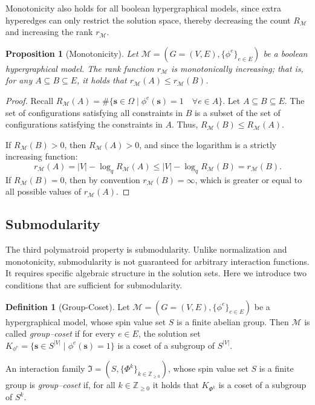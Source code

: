 \documentclass[11pt,reqno]{amsart}
\newcommand{\vecs}{\boldsymbol{s}}
\newcommand{\Mo}{\mathcal{M}}
\newcommand{\statespace}{\Omega}
\newcommand{\IFam}{\mathfrak{I}}
\newcommand{\sset}{spin value set }
\theoremstyle{plain}
\newtheorem{proposition}[theorem]{Proposition}
\theoremstyle{definition}
\newtheorem{definition}[theorem]{Definition}
\numberwithin{equation}{section}
\begin{document}
Monotonicity also holds for all boolean hypergraphical models, since extra hyper\-edges can only restrict the solution space, thereby decreasing the count $R_{\Mo}$ and increasing the rank $r_{\Mo}$.

\begin{proposition}[Monotonicity]
    Let $\Mo = (G=(V,E), \{\phi^e\}_{e \in E})$ be a boolean hypergraphical model. The rank function $r_{\Mo}$ is monotonically increasing; that is, for any $A \subseteq B \subseteq E$, it holds that $r_{\Mo}(A) \leq r_{\Mo}(B)$.
\end{proposition}
\begin{proof}
    Recall $R_{\Mo}(A) = \#\{\vecs \in \statespace \mid \phi^e(\vecs) = 1 \quad \forall e \in A\}$.
    Let $A \subseteq B \subseteq E$. The set of configurations satisfying all constraints in $B$ is a subset of the set of configurations satisfying the constraints in $A$. Thus, $R_{\Mo}(B) \leq R_{\Mo}(A)$.
    
    If $R_{\Mo}(B) > 0$, then $R_{\Mo}(A) > 0$, and since the logarithm is a strictly increasing function:
    \[ r_{\Mo}(A) = |V| - \log_q R_{\Mo}(A) \leq |V| - \log_q R_{\Mo}(B) = r_{\Mo}(B). \]
    If $R_{\Mo}(B) = 0$, then by convention $r_{\Mo}(B) = \infty$, which is greater or equal to all possible values of $r_{\Mo}(A)$.
\end{proof}

\subsection{Submodularity}
The third polymatroid property is submodularity. Unlike normalization and monotonicity, submodularity is not guaranteed for arbitrary interaction functions. It requires specific algebraic structure in the solution sets. Here we introduce two conditions that are sufficient for submodularity.

\begin{definition}[Group-Coset]
\label{def:group_coset_class}
Let $\Mo=(G=(V,E), \{\phi^e\}_{e \in E})$ be a hypergraphical model, whose \sset $S$ is a finite abelian group. Then $\Mo$ is called \emph{group--coset} if for every $e \in E$, the solution set $K_{\phi^e}=\{\vecs\in S^{|V|} \mid \phi^e(\vecs)=1\}$ is a coset of a subgroup of $S^{|V|}$.

An interaction family $\IFam = (S,\{ \Phi^k\}_{k \in \mathbb{Z}_{\geq 0}})$, whose \sset $S$ is a finite group is \emph{group--coset} if, for all $k \in \mathbb{Z}_{\geq 0}$ it holds that $K_{\Phi^k}$ is a coset of a subgroup of $S^k$.
\end{definition}
\end{document}
